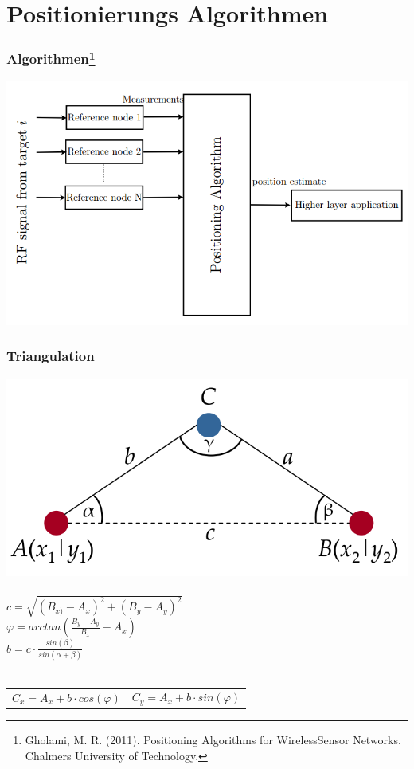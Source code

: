 \section{Positionierungs Algorithmen}
\label{sec:algorithmen}

\begin{frame}
  \frametitle{Algorithmen\footnote{Gholami, M. R. (2011). Positioning Algorithms for
      WirelessSensor Networks. Chalmers University of Technology.}}

  \begin{center}
    \includegraphics[scale=0.35]{img/algo_1}
  \end{center}
\end{frame}

\begin{frame}
  \frametitle{Triangulation}

  \begin{center}
    \includegraphics[scale=0.2]{img/triang}\\~\\

    $c = \sqrt{(B_{x)} - A_{x})^2 + (B_{y} - A_{y})^2}$\\
    $\varphi = arctan(\frac{B_{y} - A_{y}}{B_{x}} - A_{x})$\\
    $b = c \cdot \frac{sin(\beta)}{sin(\alpha + \beta)}$\\~\\

     \begin{tabular}{rr}
       $C_{x} = A_{x} + b \cdot cos(\varphi)$ & $C_{y} = A_{x} + b \cdot sin(\varphi)$ \\ 
     \end{tabular}
  \end{center}
\end{frame}

